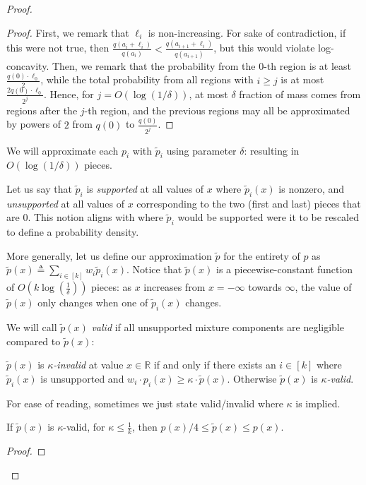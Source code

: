 \begin{proof}
\begin{proof}
        First, we remark that $\ell_i$ is non-increasing. For sake of contradiction, if this were not true, then $\frac{q(a_i + \ell_i)}{q(a_i)} < \frac{q(a_{i+1}+\ell_i)}{q(a_{i+1})}$, but this would violate log-concavity. Then, we remark that the probability from the $0$-th region is at least $\frac{q(0) \cdot \ell_0}{2}$, while the total probability from all regions with $i\ge j$ is at most $\frac{2 q(0)\cdot \ell_0}{2^j}$. Hence, for $j = O(\log(1/\delta))$, at most $\delta$ fraction of mass comes from regions after the $j$-th region, and the previous regions may all be approximated by powers of $2$ from $q(0)$ to $\frac{q(0)}{2^j}$.
    \end{proof}
    
    We will approximate each $p_i$ with $\tilde{p}_i$ using parameter $\delta$: resulting in $O(\log(1/\delta))$ pieces.

    
    Let us say that $\tilde{p}_i$ is \emph{supported} at all values of $x$ where $\tilde{p}_i(x)$ is nonzero, and \emph{unsupported} at all values of $x$ corresponding to the two (first and last) pieces that are $0$. 
    This notion aligns with where $\tilde{p}_i$ would be supported were it to be rescaled to define a probability density. 
 
    

    
    More generally, let us define our approximation $\tilde{p}$ for the entirety of $p$ as $\tilde{p}(x) \triangleq \sum_{i \in [k]} w_i \tilde{p}_i(x)$.
    Notice that $\tilde{p}(x)$ is a piecewise-constant function of $O(k \log(\frac{1}{\delta}))$ pieces: as $x$ increases from $x = -\infty$ towards $\infty$, the value of $\tilde{p}(x)$ only changes when one of $\tilde{p}_i(x)$ changes.

 We will call $\tilde{p}(x)$ \emph{valid} if all unsupported mixture components are negligible compared to $\tilde{p}(x)$:
    \begin{definition}\label{def:valid}
        $\tilde{p}(x)$ is \emph{$\kappa$-invalid} at value $x \in \mathbb{R}$ if and only if there exists an $i \in [k]$ where $\tilde{p}_i(x)$ is unsupported and $w_i \cdot p_i(x) \ge \kappa \cdot \tilde{p}(x)$. Otherwise $\tilde{p}(x)$ is \emph{$\kappa$-valid}.
    \end{definition}
    For ease of reading, sometimes we just state valid/invalid where $\kappa$ is implied.
    
    \begin{claim}\label{rem:tilde-tight}
        If $\tilde{p}(x)$ is $\kappa$-valid, for $\kappa \le \frac{1}{k}$, then $p(x)/4 \le \tilde{p}(x) \le p(x)$.
    \end{claim}
    \begin{proof}
    

\end{proof}
\end{proof}
